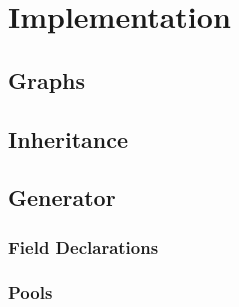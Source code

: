 \chapter{Implementation}
\section{Graphs}
\section{Inheritance}
\section{Generator}
  \subsection{Field Declarations}
  \subsection{Pools}
